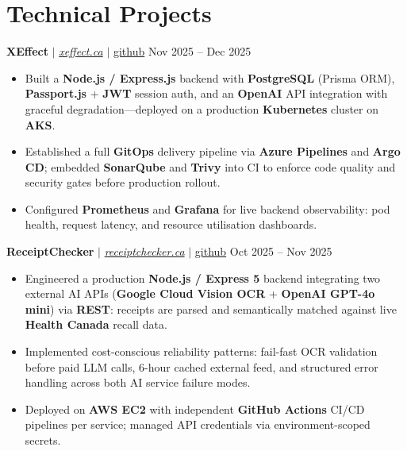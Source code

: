 \documentclass[11pt,a4paper]{article}
\begin{document}
\section{Technical Projects}

\textbf{XEffect} $|$ \href{https://www.xeffect.ca/app}{\emph{xeffect.ca}} $|$ \href{https://github.com/bhat0155/xeffect}{\small github} \hfill Nov 2025 -- Dec 2025
\begin{itemize}
    \item Built a \textbf{Node.js / Express.js} backend with \textbf{PostgreSQL} (Prisma ORM), \textbf{Passport.js} + \textbf{JWT} session auth, and an \textbf{OpenAI} API integration with graceful degradation---deployed on a production \textbf{Kubernetes} cluster on \textbf{AKS}.
    \item Established a full \textbf{GitOps} delivery pipeline via \textbf{Azure Pipelines} and \textbf{Argo CD}; embedded \textbf{SonarQube} and \textbf{Trivy} into CI to enforce code quality and security gates before production rollout.
    \item Configured \textbf{Prometheus} and \textbf{Grafana} for live backend observability: pod health, request latency, and resource utilisation dashboards.
\end{itemize}

\vspace{4pt}

\textbf{ReceiptChecker} $|$ \href{https://receiptchecker.ca/}{\emph{receiptchecker.ca}} $|$ \href{https://github.com/bhat0155/receipt-check}{\small github} \hfill Oct 2025 -- Nov 2025
\begin{itemize}
    \item Engineered a production \textbf{Node.js / Express 5} backend integrating two external AI APIs (\textbf{Google Cloud Vision OCR} + \textbf{OpenAI GPT-4o mini}) via \textbf{REST}: receipts are parsed and semantically matched against live \textbf{Health Canada} recall data.
    \item Implemented cost-conscious reliability patterns: fail-fast OCR validation before paid LLM calls, 6-hour cached external feed, and structured error handling across both AI service failure modes.
    \item Deployed on \textbf{AWS EC2} with independent \textbf{GitHub Actions} CI/CD pipelines per service; managed API credentials via environment-scoped secrets.
\end{itemize}

\vspace{4pt}
\end{document}
